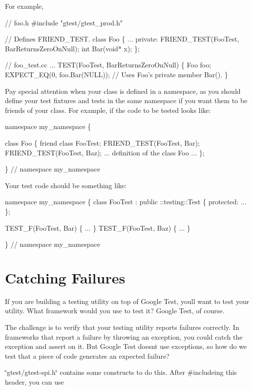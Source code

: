 For example, 
\begin{DoxyCode}
// foo.h
#include "gtest/gtest\_prod.h"

// Defines FRIEND\_TEST.
class Foo \{
  ...
 private:
  FRIEND\_TEST(FooTest, BarReturnsZeroOnNull);
  int Bar(void* x);
\};

// foo\_test.cc
...
TEST(FooTest, BarReturnsZeroOnNull) \{
  Foo foo;
  EXPECT\_EQ(0, foo.Bar(NULL));
  // Uses Foo's private member Bar().
\}
\end{DoxyCode}


Pay special attention when your class is defined in a namespace, as you should define your test fixtures and tests in the same namespace if you want them to be friends of your class. For example, if the code to be tested looks like\+:


\begin{DoxyCode}
namespace my\_namespace \{

class Foo \{
  friend class FooTest;
  FRIEND\_TEST(FooTest, Bar);
  FRIEND\_TEST(FooTest, Baz);
  ...
  definition of the class Foo
  ...
\};

\}  // namespace my\_namespace
\end{DoxyCode}


Your test code should be something like\+:


\begin{DoxyCode}
namespace my\_namespace \{
class FooTest : public ::testing::Test \{
 protected:
  ...
\};

TEST\_F(FooTest, Bar) \{ ... \}
TEST\_F(FooTest, Baz) \{ ... \}

\}  // namespace my\_namespace
\end{DoxyCode}


\section*{Catching Failures}

If you are building a testing utility on top of Google Test, you\textquotesingle{}ll want to test your utility. What framework would you use to test it? Google Test, of course.

The challenge is to verify that your testing utility reports failures correctly. In frameworks that report a failure by throwing an exception, you could catch the exception and assert on it. But Google Test doesn\textquotesingle{}t use exceptions, so how do we test that a piece of code generates an expected failure?

{\ttfamily \char`\"{}gtest/gtest-\/spi.\+h\char`\"{}} contains some constructs to do this. After {\ttfamily \#include}ing this header, you can use

